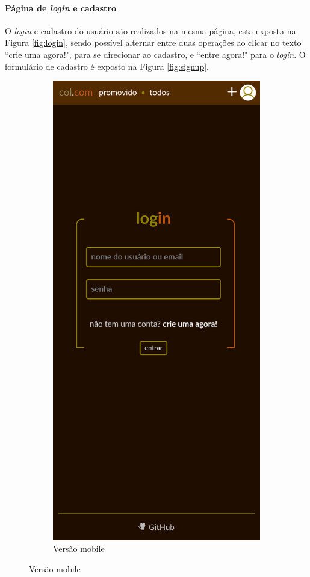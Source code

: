 \paragraph{Página de \textit{login} e cadastro}
O \textit{login} e cadastro do usuário são realizados na mesma página, esta exposta na Figura \ref{fig:login}, sendo possível alternar entre duas operações ao clicar no texto “crie uma agora!", para se direcionar ao cadastro, e “entre agora!" para o \textit{login}. O formulário de cadastro é exposto na Figura \ref{fig:signup}.

\begin{figure}[hbt!]
\centering
\begin{subfigure}{.3\textwidth}
  \centering
  \includegraphics[width=.66\linewidth]{imagens/captures/m_login.png}
  \caption{Versão mobile}
\end{subfigure}%

\end{figure}
